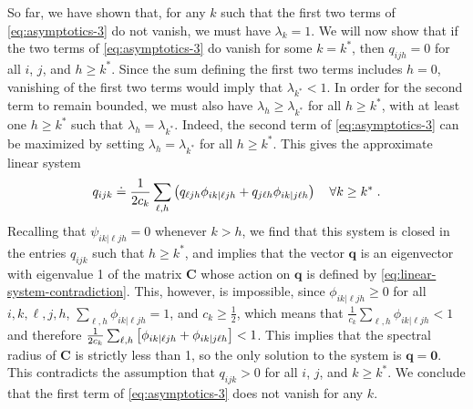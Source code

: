 So far, we have shown that, for any $k$ such that the first two terms of \cref{eq:asymptotics-3} do not vanish, we must have $\lambda_k = 1$.
We will now show that if the two terms of \cref{eq:asymptotics-3} do vanish for some $k = k^*$, then $q_{ijh} = 0$ for all $i$,  $j$, and $h \geq k^*$.
Since the sum defining the first two terms includes $h = 0$, vanishing of the first two terms would imply that $\lambda_{k^*} < 1$. 
In order for the second term to remain bounded, we must also have $\lambda_h \geq \lambda_{k^*}$ for all $h \geq k^*$, with at least one $h\geq k^*$ such that $\lambda_h = \lambda_{k^*}$.
Indeed, the second term of \cref{eq:asymptotics-3} can be maximized by setting $\lambda_{h} = \lambda_{k^*}$ for all $h \geq {k^*}$.
This gives the approximate linear system 
\begin{align}
    q_{ijk} \doteq \frac{1}{2c_k} \sum_{\ell, h}  \left(q_{\ell j h} \phi_{ik|\ell jh} + q_{j \ell h} \phi_{ik|j\ell h}\right) \quad \forall k \geq k^*\;. \label{eq:linear-system-contradiction}
\end{align}
Recalling that $\psi_{ik|\ell jh} = 0$ whenever $k > h$, we find that this system is closed in the entries $q_{ijk}$ such that $h \geq {k^*}$, and implies that the vector $\mathbf{q}$ is an eigenvector with eigenvalue 1 of the matrix $\mathbf{C}$ whose action on $\mathbf{q}$ is defined by \cref{eq:linear-system-contradiction}. 
This, however, is impossible, since $\phi_{ik|\ell jh} \geq 0$ for all $i, k, \ell, j, h$, $\sum_{\ell, h }\phi_{ik|\ell jh} = 1$, and $c_k \geq \frac{1}{2}$, which means that $\frac{1}{c_k}\sum_{\ell, h }\phi_{ik|\ell jh} < 1$ and therefore $\frac{1}{2c_k}\sum_{\ell, h }\left[\phi_{ik|\ell jh} + \phi_{ik|j \ell h}\right] < 1$.
This implies that the spectral radius of $\mathbf{C}$ is strictly less than 1, so the only solution to the system is $\mathbf{q} = \mathbf{0}$.
This contradicts the assumption that $q_{ijk} > 0$ for all $i$, $j$, and $k\geq k^*$.
We conclude that the first term of \cref{eq:asymptotics-3} does not vanish for any $k$.

